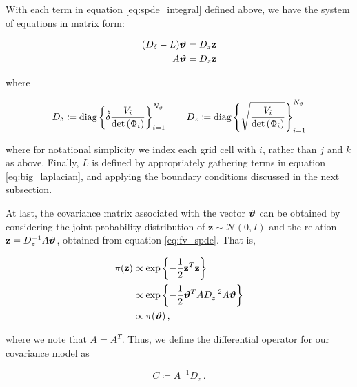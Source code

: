 With each term in equation \eqref{eq:spde_integral} defined above, we have the system of
equations in matrix form:
\begin{linenomath}\begin{equation}
    \begin{aligned}
        (D_\delta - L) \bm{\vartheta} &= D_z\mathbf{z}\\
        A\bm{\vartheta} &= D_z\mathbf{z}
    \end{aligned}
    \label{eq:fv_spde}
\end{equation}\end{linenomath}
where
\begin{linenomath*}\begin{equation*}
    \begin{aligned}
        D_\delta \coloneqq \text{diag}
            \left\{
                \hat{\delta}\dfrac{V_i}{\text{det}\left(\Phi_{i}\right)}
            \right\}_{i=1}^{N_{\vartheta}}
            \qquad
        D_z \coloneqq \text{diag}
            \left\{
                \sqrt{\dfrac{V_i}{\text{det}\left(\Phi_{i}\right)}}
            \right\}_{i=1}^{N_{\vartheta}}
    \end{aligned}
\end{equation*}\end{linenomath*}
where for notational simplicity we index each grid cell with $i$, rather than
$j$ and $k$ as above.
Finally, $L$ is defined by appropriately gathering terms in
equation \eqref{eq:big_laplacian}, and applying the boundary conditions discussed in the next
subsection.

At last, the covariance matrix associated with the vector $\bm{\vartheta}$ can be
obtained by considering the joint probability distribution of
$\mathbf{z}\sim\mathcal{N}(0,I)$ and
the relation $\mathbf{z} = D_z^{-1}A\bm{\vartheta}$, obtained from
equation \eqref{eq:fv_spde}.
That is,
\begin{linenomath*}\begin{equation*}
    \begin{aligned}
        \pi(\mathbf{z})
        &\propto  \exp\left\{-\dfrac{1}{2}\mathbf{z}^T\mathbf{z}\right\} \\
        &\propto \exp\left\{-\dfrac{1}{2}\bm{\vartheta}^T A D_z^{-2} A \bm{\vartheta}\right\} \\
        &\propto \pi(\bm{\vartheta}) \, ,
    \end{aligned}
\end{equation*}\end{linenomath*}
where we note that $A=A^T$.
Thus, we define the differential operator for our covariance model as
\begin{linenomath*}\begin{equation*}
    C \coloneqq A^{-1} D_z \, .
\end{equation*}\end{linenomath*}
\\

